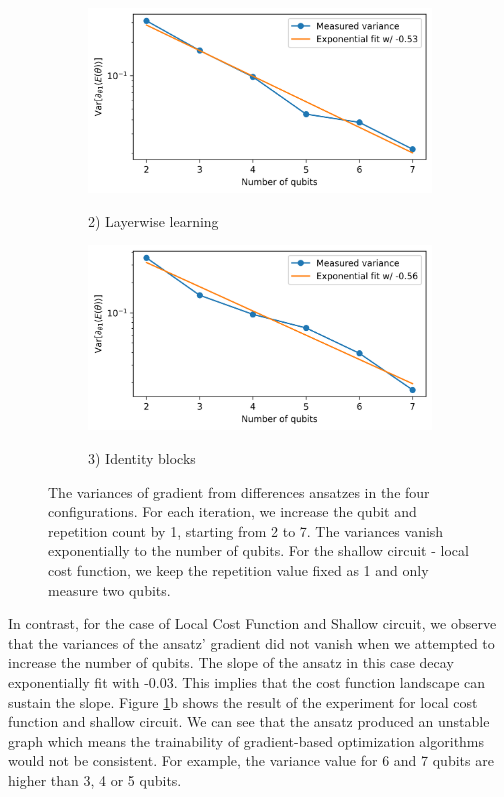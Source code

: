 \begin{figure}
    \begin{subfigure}[b]{.49\linewidth}
        \includegraphics[width=\linewidth]{Artefact/Appendices/var2.png}
        \centerline{2) Layerwise learning}
    \end{subfigure}
    \hfill
    \begin{subfigure}[b]{.49\linewidth}
        \includegraphics[width=\linewidth]{Artefact/Appendices/var3.png}
        \centerline{3) Identity blocks}
    \end{subfigure}

    \caption{
        The variances of gradient from differences ansatzes in the four configurations.
        For each iteration, we increase the qubit and repetition count by 1, starting from 2 to 7.
        The variances vanish exponentially to the number of qubits.
        For the shallow circuit - local cost function, we keep the repetition value fixed as 1 and only measure two qubits.
    }
    \label{Plot ansatzes variance}
\end{figure}


In contrast, for the case of Local Cost Function and Shallow circuit, we observe that the variances of the ansatz' gradient did not vanish when we attempted to increase the number of qubits.
The slope of the ansatz in this case decay exponentially fit with -0.03.
This implies that the cost function landscape can sustain the slope.
Figure \ref{Plot ansatzes variance}b shows the result of the experiment for local cost function and shallow circuit.
We can see that the ansatz produced an unstable graph which means the trainability of gradient-based optimization algorithms would not be consistent.
For example, the variance value for 6 and 7 qubits are higher than 3, 4 or 5 qubits.


